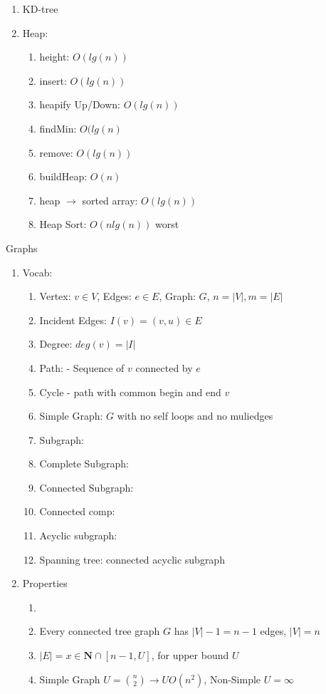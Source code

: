 \documentclass[12pt]{article}
\newcommand{\abs}[1]{\left| #1 \right|} %
\renewcommand{\=}[1]{\stackrel{#1}{=}} %
\theoremstyle{definition}
\theoremstyle{remark}
\begin{document}
\begin{enumerate}
\begin{enumerate}
\begin{enumerate}
      \item KD-tree
      \item Heap:
        \begin{enumerate}
        \item height: $O(lg(n))$
        \item insert: $O(lg(n))$
        \item heapify Up/Down: $O(lg(n))$
        \item findMin: $O(lg(n)$
        \item remove: $O(lg(n))$
        \item buildHeap: $O(n)$
        \item heap $\rightarrow$ sorted array: $O(lg(n))$
        \item Heap Sort: $O(nlg(n))$ worst
        \end{enumerate}
      \end{enumerate}
    \end{enumerate}
    Graphs
    \begin{enumerate}
    \item Vocab:
      \begin{enumerate}
      \item Vertex: $v\in V$, Edges: $e\in E$, Graph: $G$, $n=
        \abs{V}, m = \abs{E}$
      \item Incident Edges: $I(v) = {(v,u) \in E}$
      \item Degree: $deg(v) = \abs{I}$
      \item Path: - Sequence of $v$ connected by $e$
      \item Cycle - path with common begin and end $v$
      \item Simple Graph: $G$ with no self loops and no muliedges
      \item Subgraph:
      \item Complete Subgraph:
      \item Connected Subgraph:
      \item Connected comp:
      \item Acyclic subgraph:
      \item Spanning tree: connected acyclic subgraph
      \end{enumerate}

    \item Properties
      \begin{enumerate}\item 
      \item Every connected tree graph $G$ has $\abs{V}-1= n-1$ edges,
        $\abs{V} = n$
      \item $\abs{E} = {x\in \mathbf{N}\cap[n-1,U]}$, for upper bound $U$
      \item Simple Graph $U=\binom{n}{2} \rightarrow U O(n^2)$,
        Non-Simple $U=\infty$
      \end{enumerate}


\end{enumerate}
\end{enumerate}
\end{document}
